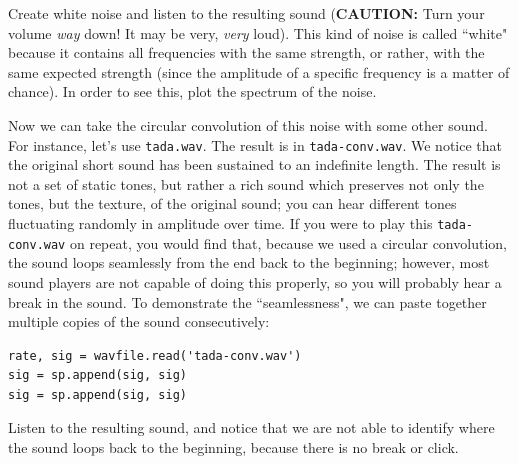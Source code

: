 \begin{problem} %
Create white noise and listen to the resulting sound (\textbf{CAUTION:} Turn your volume \emph{way} down! It may be very, \emph{very} loud).
This kind of noise is called ``white" because it contains all frequencies with the same strength, or rather, with the same expected strength (since the amplitude of a specific frequency is a matter of chance).
In order to see this, plot the spectrum of the noise.
\end{problem}

Now we can take the circular convolution of this noise with some other sound.
For instance, let's use \texttt{tada.wav}.
The result is in \texttt{tada-conv.wav}.
We notice that the original short sound has been sustained to an indefinite length.
The result is not a set of static tones, but rather a rich sound which preserves not only the tones, but the texture, of the original sound; you can hear different tones fluctuating randomly in amplitude over time.
If you were to play this \texttt{tada-conv.wav} on repeat, you would find that, because we used a circular convolution, the sound loops seamlessly from the end back to the beginning; however, most sound players are not capable of doing this properly, so you will probably hear a break in the sound. To demonstrate the ``seamlessness", we can paste together multiple copies of the sound consecutively:

\begin{lstlisting}
rate, sig = wavfile.read('tada-conv.wav')
sig = sp.append(sig, sig)
sig = sp.append(sig, sig)
\end{lstlisting}

Listen to the resulting sound, and notice that we are not able to identify where the sound loops back to the beginning, because there is no break or click.

